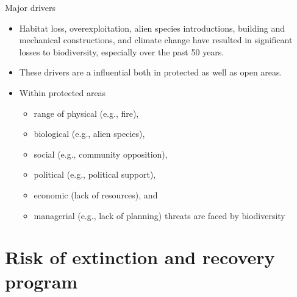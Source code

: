 \documentclass[
  ignorenonframetext,
  aspectratio=169]{beamer}
\providecommand{\tightlist}{%
  \setlength{\itemsep}{0pt}\setlength{\parskip}{0pt}}
\begin{document}
\begin{frame}{Major drivers}
\protect\hypertarget{major-drivers}{}
\begin{itemize}
\tightlist
\item
  Habitat loss, overexploitation, alien species introductions, building
  and mechanical constructions, and climate change have resulted in
  significant losses to biodiversity, especially over the past 50 years.
\item
  These drivers are a influential both in protected as well as open
  areas.
\item
  Within protected areas

  \begin{itemize}
  \tightlist
  \item
    range of physical (e.g., fire),
  \item
    biological (e.g., alien species),
  \item
    social (e.g., community opposition),
  \item
    political (e.g., political support),
  \item
    economic (lack of resources), and
  \item
    managerial (e.g., lack of planning) threats are faced by
    biodiversity
  \end{itemize}
\end{itemize}
\end{frame}

\hypertarget{risk-of-extinction-and-recovery-program}{%
\section{Risk of extinction and recovery
program}\label{risk-of-extinction-and-recovery-program}}
\end{document}
